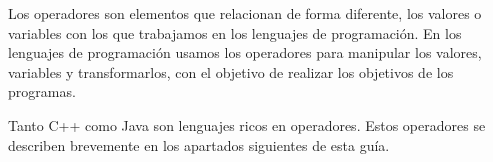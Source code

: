 Los operadores son elementos que relacionan de forma diferente, los valores o variables con los que trabajamos en los lenguajes de programación. En los lenguajes de programación usamos los operadores para manipular los valores, variables y transformarlos, con el objetivo de realizar los objetivos de los programas. 

Tanto  C++ como Java son lenguajes ricos en operadores. Estos operadores se
describen brevemente en los apartados siguientes de esta guía. 